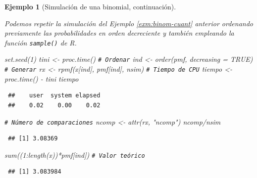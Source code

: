 \documentclass[
]{book}
\newenvironment{Shaded}{\begin{snugshade}}{\end{snugshade}}
\newcommand{\AttributeTok}[1]{\textcolor[rgb]{0.77,0.63,0.00}{#1}}
\newcommand{\CommentTok}[1]{\textcolor[rgb]{0.56,0.35,0.01}{\textit{#1}}}
\newcommand{\ConstantTok}[1]{\textcolor[rgb]{0.00,0.00,0.00}{#1}}
\newcommand{\DecValTok}[1]{\textcolor[rgb]{0.00,0.00,0.81}{#1}}
\newcommand{\FunctionTok}[1]{\textcolor[rgb]{0.00,0.00,0.00}{#1}}
\newcommand{\NormalTok}[1]{#1}
\newcommand{\OtherTok}[1]{\textcolor[rgb]{0.56,0.35,0.01}{#1}}
\newcommand{\SpecialCharTok}[1]{\textcolor[rgb]{0.00,0.00,0.00}{#1}}
\newcommand{\StringTok}[1]{\textcolor[rgb]{0.31,0.60,0.02}{#1}}
\theoremstyle{break}
\newtheorem{example}{Ejemplo}[chapter]
\theoremstyle{nonumberplain}
\renewcommand{\CommentTok}[1]{\textcolor[rgb]{0.41,0.41,0.41}{\texttt{#1}}}
\begin{document}
\begin{example}[Simulación de una binomial, continuación]
\protect\hypertarget{exm:binom-cuantb}{}\label{exm:binom-cuantb}

Podemos repetir la simulación del Ejemplo \ref{exm:binom-cuant} anterior ordenando previamente las probabilidades en orden decreciente y también empleando la función \texttt{sample()} de R.

\begin{Shaded}
\begin{Highlighting}[]
\FunctionTok{set.seed}\NormalTok{(}\DecValTok{1}\NormalTok{)}
\NormalTok{tini }\OtherTok{\textless{}{-}} \FunctionTok{proc.time}\NormalTok{()}
\CommentTok{\# Ordenar}
\NormalTok{ind }\OtherTok{\textless{}{-}} \FunctionTok{order}\NormalTok{(pmf, }\AttributeTok{decreasing =} \ConstantTok{TRUE}\NormalTok{)}
\CommentTok{\# Generar}
\NormalTok{rx }\OtherTok{\textless{}{-}} \FunctionTok{rpmf}\NormalTok{(x[ind], pmf[ind], nsim)}
\CommentTok{\# Tiempo de CPU}
\NormalTok{tiempo }\OtherTok{\textless{}{-}} \FunctionTok{proc.time}\NormalTok{() }\SpecialCharTok{{-}}\NormalTok{ tini}
\NormalTok{tiempo}
\end{Highlighting}
\end{Shaded}

\begin{verbatim}
 ##    user  system elapsed 
 ##    0.02    0.00    0.02
\end{verbatim}

\begin{Shaded}
\begin{Highlighting}[]
\CommentTok{\# Número de comparaciones}
\NormalTok{ncomp }\OtherTok{\textless{}{-}} \FunctionTok{attr}\NormalTok{(rx, }\StringTok{"ncomp"}\NormalTok{)}
\NormalTok{ncomp}\SpecialCharTok{/}\NormalTok{nsim}
\end{Highlighting}
\end{Shaded}

\begin{verbatim}
 ## [1] 3.08369
\end{verbatim}

\begin{Shaded}
\begin{Highlighting}[]
\FunctionTok{sum}\NormalTok{((}\DecValTok{1}\SpecialCharTok{:}\FunctionTok{length}\NormalTok{(x))}\SpecialCharTok{*}\NormalTok{pmf[ind]) }\CommentTok{\# Valor teórico}
\end{Highlighting}
\end{Shaded}

\begin{verbatim}
 ## [1] 3.083984
\end{verbatim}


\end{example}
\end{document}
